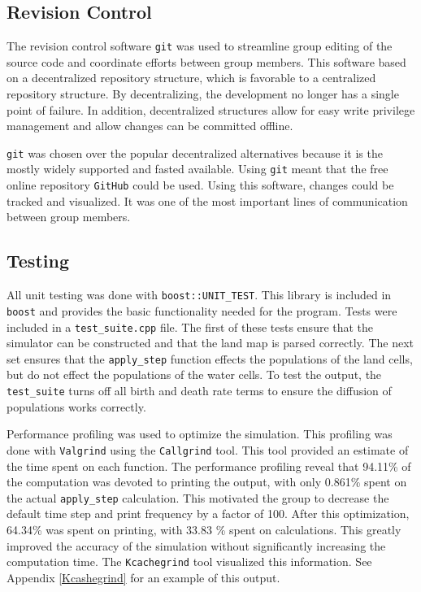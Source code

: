\documentclass[a4paper,11pt]{article}
\begin{document}
\subsection{Revision Control}

The revision control software \texttt{git} was used to streamline group editing of the source code and coordinate efforts between group members.  This software based on a decentralized repository structure, which is favorable to a centralized repository structure.  By decentralizing, the development no longer has a single point of failure.  In addition, decentralized structures allow for easy write privilege management and allow changes can be committed offline.

\texttt{git} was chosen over the popular decentralized alternatives because it is the mostly widely supported and fasted available.  Using \texttt{git} meant that the free online repository \texttt{GitHub} could be used.  Using this software, changes could be tracked and visualized.  It was one of the most important lines of communication between group members.


\subsection{Testing}\label{test}

All unit testing was done with \texttt{boost::UNIT\_TEST}.  This library is included in \texttt{boost} and provides the basic functionality needed for the program.  Tests were included in a \texttt{test\_suite.cpp} file.  The first of these tests ensure that the simulator can be constructed and that the land map is parsed correctly.  The next set ensures that the \texttt{apply\_step} function effects the populations of the land cells, but do not effect the populations of the water cells.  To test the output, the \texttt{test\_suite} turns off all birth and death rate terms to ensure the diffusion of populations works correctly.   

Performance profiling was used to optimize the simulation.  This profiling was done with \texttt{Valgrind} using the \texttt{Callgrind} tool.  This tool provided an estimate of the time spent on each function. The performance profiling reveal that 94.11\% of the computation was devoted to printing the output, with only 0.861\% spent on the actual \texttt{apply\_step} calculation.  This motivated the group to decrease the default time step and print frequency by a factor of 100.  After this optimization, 64.34\% was spent on printing, with 33.83 \% spent on calculations.  This greatly improved the accuracy of the simulation without significantly increasing the computation time.  The \texttt{Kcachegrind} tool visualized this information.  See Appendix \ref{Kcashegrind} for an example of this output. 
\end{document}
